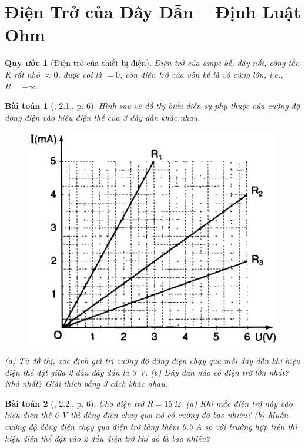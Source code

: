 \documentclass{article}
\newtheorem{baitoan}{Bài toán}
\newtheorem{quyuoc}{Quy ước}
\begin{document}

\section{Điện Trở của Dây Dẫn -- Định Luật Ohm}

\begin{quyuoc}[Điện trở của thiết bị điện]
	Điện trở của ampe kế, dây nối, công tắc K rất nhỏ $\approx0$, được coi là $= 0$, còn điện trở của vôn kế là vô cùng lớn, i.e., $R = +\infty$.
\end{quyuoc}

\begin{baitoan}[\cite{SBT_Vat_Ly_9}, 2.1., p. 6]
	Hình sau vẽ đồ thị biểu diễn sự phụ thuộc của cường độ dòng điện vào hiệu điện thế của 3 dây dẫn khác nhau.
	\begin{figure}[H]
		\centering
		\includegraphics[scale=0.25]{SBT_2.1}
	\end{figure}
	\noindent(a) Từ đồ thị, xác định giá trị cường độ dòng điện chạy qua mỗi dây dẫn khi hiệu điện thế đặt giữa 2 đầu dây dẫn là \emph{3 V}. (b) Dây dẫn nào có điện trở lớn nhất? Nhỏ nhất? Giải thích bằng 3 cách khác nhau.
\end{baitoan}

\begin{baitoan}[\cite{SBT_Vat_Ly_9}, 2.2., p. 6]
	Cho điện trở $R = 15\ \Omega$. (a) Khi mắc điện trở này vào hiệu điện thế \emph{6 V} thì dòng điện chạy qua nó có cường độ bao nhiêu? (b) Muốn cường độ dòng điện chạy qua điện trở tăng thêm \emph{0.3 A} so với trường hợp trên thì hiệu điện thế đặt vào 2 đầu điện trở khi đó là bao nhiêu?
\end{baitoan}
\end{document}
